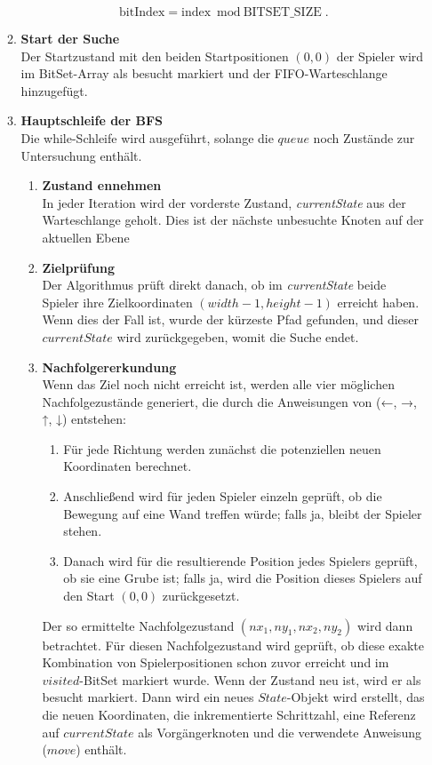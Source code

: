 \documentclass[a4paper,10pt,ngerman]{scrartcl}
\begin{document}
\begin{enumerate}
\begin{enumerate}
        \begin{equation}
         \text{bitIndex} = \text{index} \bmod \text{BITSET\_SIZE}.
  \label{5}
        \end{equation}
    \item \textbf{Start der Suche}\\
        Der Startzustand mit den beiden Startpositionen $(0,0)$ der Spieler wird im BitSet-Array als besucht markiert und der FIFO-Warteschlange hinzugefügt.  
    \item \textbf{Hauptschleife der BFS}\\
    Die while-Schleife wird ausgeführt, solange die $queue$ noch Zustände zur Untersuchung enthält.
    \begin{enumerate}
      \item \textbf{Zustand ennehmen}\\
      In jeder Iteration wird der vorderste Zustand, \textit{currentState} aus der Warteschlange geholt. Dies ist der nächste unbesuchte Knoten auf der aktuellen Ebene 
      \item \textbf{Zielprüfung}\\
      Der Algorithmus prüft direkt danach, ob im \textit{currentState} beide Spieler ihre Zielkoordinaten $(width-1, height-1)$ erreicht haben. Wenn dies der Fall ist, wurde der kürzeste Pfad gefunden, und dieser $currentState$ wird zurückgegeben, womit die Suche endet. 
      \item \textbf{Nachfolgererkundung}\\
      Wenn das Ziel noch nicht erreicht ist, werden alle vier möglichen Nachfolgezustände generiert, die durch die Anweisungen von (←, →, ↑, ↓) entstehen: 
      \begin{enumerate}
        \item Für jede Richtung werden zunächst die potenziellen neuen Koordinaten berechnet. 
        \item Anschließend wird für jeden Spieler einzeln geprüft, ob die Bewegung auf eine Wand treffen würde; falls ja, bleibt der Spieler stehen. 
        \item     Danach wird für die resultierende Position jedes Spielers geprüft, ob sie eine Grube ist; falls ja, wird die Position dieses Spielers auf den Start $(0, 0)$ zurückgesetzt. 
      \end{enumerate}
      Der so ermittelte Nachfolgezustand $(nx_1, ny_1, nx_2, ny_2)$ wird dann betrachtet. Für diesen Nachfolgezustand wird geprüft, ob diese exakte Kombination von Spielerpositionen schon zuvor erreicht und im $visited$-BitSet markiert wurde. Wenn der Zustand neu ist, wird er als besucht markiert. Dann wird ein neues $State$-Objekt wird erstellt, das die neuen Koordinaten, die inkrementierte Schrittzahl, eine Referenz auf $currentState$ als Vorgängerknoten und die verwendete Anweisung ($move$) enthält. 

\end{enumerate}
\end{enumerate}
\end{enumerate}
\end{document}
